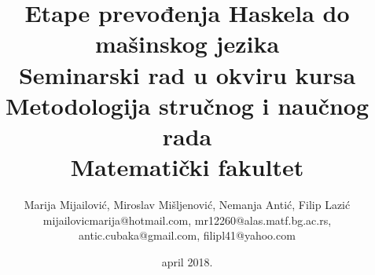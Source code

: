 \documentclass[a4paper]{article}
\begin{document}
\title{Etape prevođenja Haskela do mašinskog jezika\\ \small{Seminarski rad u okviru kursa\\Metodologija stručnog i naučnog rada\\ Matematički fakultet}}

\author{Marija Mijailović, Miroslav Mišljenović, Nemanja Antić, Filip Lazić\\ mijailovicmarija@hotmail.com, mr12260@alas.matf.bg.ac.rs,\\ antic.cubaka@gmail.com, filipl41@yahoo.com}
\date{april 2018.}
\maketitle



\setcounter{tocdepth}{1}
\tableofcontents

\newpage








\appendix
 


%
\end{document}
